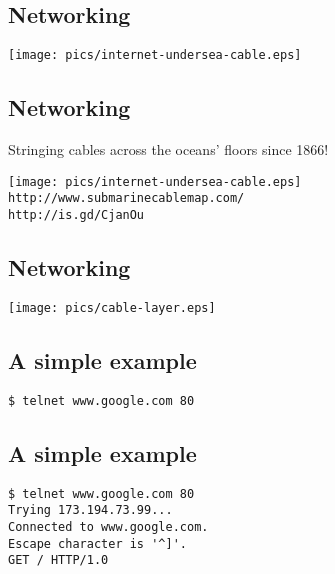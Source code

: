 \documentclass[xga]{xdvislides}
\begin{document}
\subsection{Networking}
\vspace*{\fill}
\begin{center}
	\texttt{[image: pics/internet-undersea-cable.eps]} \\
\end{center}
\vspace*{\fill}


\subsection{Networking}
Stringing cables across the oceans' floors since 1866!
\vspace*{\fill}
\begin{center}
	\texttt{[image: pics/internet-undersea-cable.eps]} \\
	\verb+http://www.submarinecablemap.com/+ \\
	\verb+http://is.gd/CjanOu+
\end{center}
\vspace*{\fill}

\subsection{Networking}
\vspace*{\fill}
\begin{center}
	\texttt{[image: pics/cable-layer.eps]} \\
\end{center}
\vspace*{\fill}




\subsection{A simple example}
\Hugesize
\begin{center}
\begin{verbatim}
$ telnet www.google.com 80

\end{verbatim}
\end{center}
\Normalsize
\vspace*{\fill}

\subsection{A simple example}
\Hugesize
\begin{center}
\begin{verbatim}
$ telnet www.google.com 80
Trying 173.194.73.99...
Connected to www.google.com.
Escape character is '^]'.
GET / HTTP/1.0

\end{verbatim}
\end{center}
\Normalsize
\vspace*{\fill}
\end{document}

